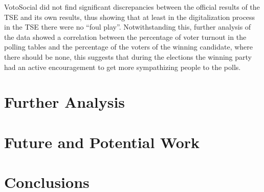 \documentclass[a4paper,10pt]{article}
\begin{document}
VotoSocial did not find significant discrepancies between the official results of the TSE and its own results, thus showing that at least in the digitalization process in the TSE there were no “foul play”. Notwithstanding this, further analysis of the data showed a correlation between the percentage of voter turnout in the polling tables and the percentage of the voters of the winning candidate, where there should be none, this suggests that during the elections the winning party had an active encouragement to get more sympathizing people to the polls.



\section{Further Analysis}

\section{Future and Potential Work}

\section{Conclusions}


\newpage




\end{document}
